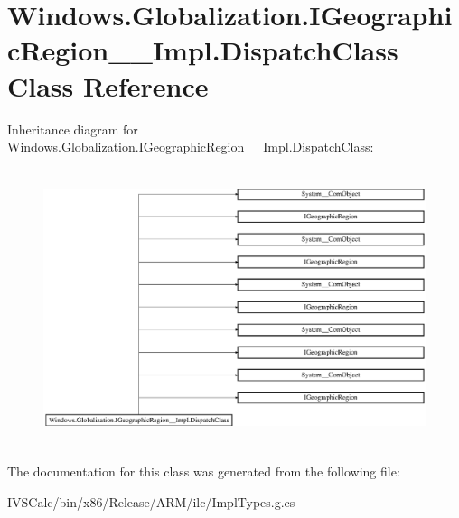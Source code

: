 \hypertarget{class_windows_1_1_globalization_1_1_i_geographic_region_____impl_1_1_dispatch_class}{}\section{Windows.\+Globalization.\+I\+Geographic\+Region\+\_\+\+\_\+\+Impl.\+Dispatch\+Class Class Reference}
\label{class_windows_1_1_globalization_1_1_i_geographic_region_____impl_1_1_dispatch_class}
Inheritance diagram for Windows.\+Globalization.\+I\+Geographic\+Region\+\_\+\+\_\+\+Impl.\+Dispatch\+Class\+:\begin{figure}[H]
\begin{center}
\leavevmode
\includegraphics[height=8.148149cm]{class_windows_1_1_globalization_1_1_i_geographic_region_____impl_1_1_dispatch_class}
\end{center}
\end{figure}


The documentation for this class was generated from the following file\+:\begin{DoxyCompactItemize}
\item 
I\+V\+S\+Calc/bin/x86/\+Release/\+A\+R\+M/ilc/Impl\+Types.\+g.\+cs\end{DoxyCompactItemize}
